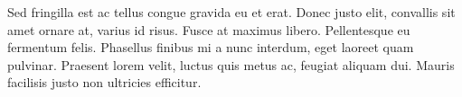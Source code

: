 %
%
%
\par{
    Sed fringilla est ac tellus congue gravida eu et erat. Donec justo elit, convallis sit amet ornare at, varius id risus. Fusce at maximus libero. Pellentesque eu fermentum felis. Phasellus finibus mi a nunc interdum, eget laoreet quam pulvinar. Praesent lorem velit, luctus quis metus ac, feugiat aliquam dui. Mauris facilisis justo non ultricies efficitur.
}